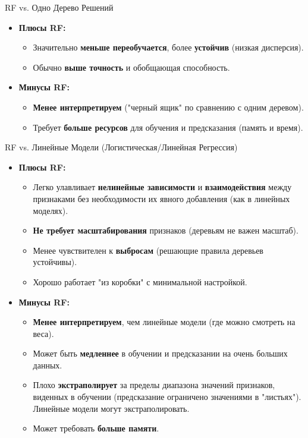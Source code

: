 \begin{myblock}{RF vs. Одно Дерево Решений}
    \begin{itemize}
        \item \textbf{Плюсы RF:}
            \begin{itemize}
                \item Значительно \textbf{меньше переобучается}, более \textbf{устойчив} (низкая дисперсия).
                \item Обычно \textbf{выше точность} и обобщающая способность.
            \end{itemize}
        \item \textbf{Минусы RF:}
            \begin{itemize}
                \item \textbf{Менее интерпретируем} ("черный ящик" по сравнению с одним деревом).
                \item Требует \textbf{больше ресурсов} для обучения и предсказания (память и время).
            \end{itemize}
    \end{itemize}
\end{myblock}

\begin{myblock}{RF vs. Линейные Модели (Логистическая/Линейная Регрессия)}
    \begin{itemize}
        \item \textbf{Плюсы RF:}
            \begin{itemize}
                \item Легко улавливает \textbf{нелинейные зависимости} и \textbf{взаимодействия} между признаками без необходимости их явного добавления (как в линейных моделях).
                \item \textbf{Не требует масштабирования} признаков (деревьям не важен масштаб).
                \item Менее чувствителен к \textbf{выбросам} (решающие правила деревьев устойчивы).
                \item Хорошо работает "из коробки" с минимальной настройкой.
            \end{itemize}
        \item \textbf{Минусы RF:}
            \begin{itemize}
                \item \textbf{Менее интерпретируем}, чем линейные модели (где можно смотреть на веса).
                \item Может быть \textbf{медленнее} в обучении и предсказании на очень больших данных.
                \item Плохо \textbf{экстраполирует} за пределы диапазона значений признаков, виденных в обучении (предсказание ограничено значениями в "листьях"). Линейные модели могут экстраполировать.
                \item Может требовать \textbf{больше памяти}.
            \end{itemize}
    \end{itemize}
\end{myblock}

